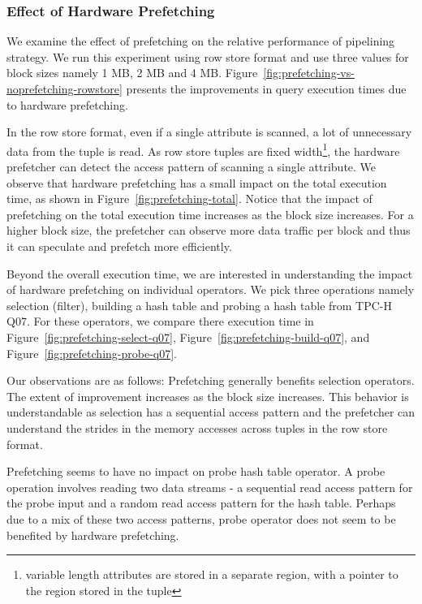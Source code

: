 \subsubsection{Effect of Hardware Prefetching}
We examine the effect of prefetching on the relative performance of pipelining strategy. 
We run this experiment using row store format and use three values for block sizes namely 1 MB, 2 MB and 4 MB.
Figure~\ref{fig:prefetching-vs-noprefetching-rowstore} presents the improvements in query execution times due to hardware prefetching. 

In the row store format, even if a single attribute is scanned, a lot of unnecessary data from the tuple is read.
As row store tuples are fixed width\footnote{variable length attributes are stored in a separate region, with a pointer to the region stored in the tuple}, the hardware prefetcher can detect the access pattern of scanning a single attribute. 
We observe that hardware prefetching has a small impact on the total execution time, as shown in Figure~\ref{fig:prefetching-total}. 
Notice that the impact of prefetching on the total execution time increases as the block size increases. 
For a higher block size, the prefetcher can observe more data traffic per block and thus it can speculate and prefetch more efficiently. 

Beyond the overall execution time, we are interested in understanding the impact of hardware prefetching on individual operators. 
We pick three operations namely selection (filter), building a hash table and probing a hash table from TPC-H Q07.
For these operators, we compare there execution time in Figure~\ref{fig:prefetching-select-q07}, Figure~\ref{fig:prefetching-build-q07}, and Figure~\ref{fig:prefetching-probe-q07}.

Our observations are as follows:
Prefetching generally benefits selection operators. 
The extent of improvement increases as the block size increases. 
This behavior is understandable as selection has a sequential access pattern and the prefetcher can understand the strides in the memory accesses across tuples in the row store format.

Prefetching seems to have no impact on probe hash table operator.
A probe operation involves reading two data streams - a sequential read access pattern for the probe input and a random read access pattern for the hash table. 
Perhaps due to a mix of these two access patterns, probe operator does not seem to be benefited by hardware prefetching. 

